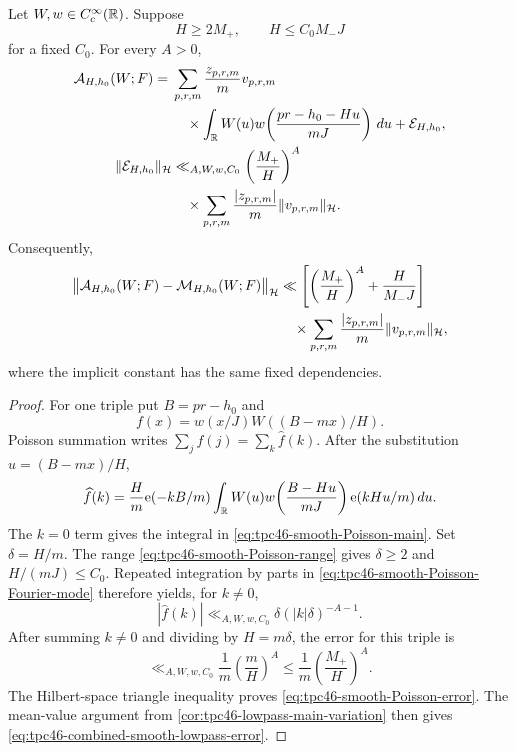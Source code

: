\begin{theorem}
\label{thm:tpc46-smooth-Poisson-approximation}
Let \(W,w\in C_c^\infty(\mathbb R)\).  Suppose
\begin{equation}
 H\ge2M_+,
 \qquad H\le C_0M_-J
 \label{eq:tpc46-smooth-Poisson-range}
\end{equation}
for a fixed \(C_0\).  For every \(A>0\),
\begin{align}
 \mathcal A_{H,h_0}(W;F)
 ={}&\sum_{p,r,m}
 \frac{z_{p,r,m}}m v_{p,r,m}\notag\\
 &\quad\times
 \int_{\mathbb R}W(u)
 w\!\left(\frac{pr-h_0-Hu}{mJ}\right)\,du
 +\mathcal E_{H,h_0},
 \label{eq:tpc46-smooth-Poisson-main}\\
 \|\mathcal E_{H,h_0}\|_{\mathcal H}
 &\ll_{A,W,w,C_0}
 \left(\frac{M_+}{H}\right)^A\notag\\
 &\quad\times
 \sum_{p,r,m}
 \frac{|z_{p,r,m}|}{m}\|v_{p,r,m}\|_{\mathcal H}.
 \label{eq:tpc46-smooth-Poisson-error}
\end{align}
Consequently,
\begin{align}
 \bigl\|\mathcal A_{H,h_0}(W;F)-\mathcal M_{H,h_0}(W;F)\bigr\|_{\mathcal H}
 &\ll
 \left[
 \left(\frac{M_+}{H}\right)^A
 +\frac{H}{M_-J}
 \right]\notag\\
 &\quad\times
 \sum_{p,r,m}
 \frac{|z_{p,r,m}|}{m}\|v_{p,r,m}\|_{\mathcal H},
 \label{eq:tpc46-combined-smooth-lowpass-error}
\end{align}
where the implicit constant has the same fixed dependencies.
\end{theorem}

\begin{proof}
For one triple put \(B=pr-h_0\) and
\[
 f(x)=w(x/J)W((B-mx)/H).
\]
Poisson summation writes \(\sum_jf(j)=\sum_k\widehat f(k)\).  After
the substitution \(u=(B-mx)/H\),
\begin{equation}
 \widehat f(k)
 =\frac Hm\mathrm e(-kB/m)
 \int_{\mathbb R}W(u)
 w\!\left(\frac{B-Hu}{mJ}\right)
 \mathrm e(kHu/m)\,du.
 \label{eq:tpc46-smooth-Poisson-Fourier-mode}
\end{equation}
The \(k=0\) term gives the integral in
\eqref{eq:tpc46-smooth-Poisson-main}.  Set \(\delta=H/m\).  The range
\eqref{eq:tpc46-smooth-Poisson-range} gives \(\delta\ge2\) and
\(H/(mJ)\le C_0\).  Repeated integration by parts in
\eqref{eq:tpc46-smooth-Poisson-Fourier-mode} therefore yields, for
\(k\ne0\),
\[
 |\widehat f(k)|
 \ll_{A,W,w,C_0}\delta(|k|\delta)^{-A-1}.
\]
After summing \(k\ne0\) and dividing by \(H=m\delta\), the error for
this triple is
\[
 \ll_{A,W,w,C_0}
 \frac1m\left(\frac mH\right)^A
 \le
 \frac1m\left(\frac{M_+}{H}\right)^A.
\]
The Hilbert-space triangle inequality proves
\eqref{eq:tpc46-smooth-Poisson-error}.  The mean-value argument from
\cref{cor:tpc46-lowpass-main-variation} then gives
\eqref{eq:tpc46-combined-smooth-lowpass-error}.
\end{proof}

